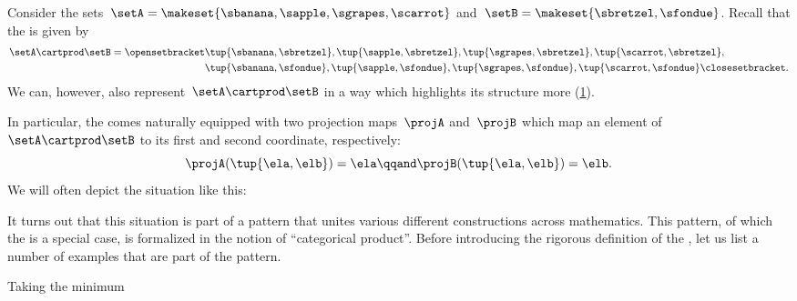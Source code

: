 \begin{example}
    Consider the sets~$\setA = \makeset{\sbanana, \sapple, \sgrapes, \scarrot}$ and~$\setB = \makeset{ \sbretzel, \sfondue }$.
    Recall that the  is given by
    \begin{equation}
        \label{eq:cart-prod-example}
        \begin{aligned}
            \setA \cartprod \setB = \opensetbracket & \tup{\sbanana, \sbretzel}, \tup{\sapple, \sbretzel}, \tup{\sgrapes, \sbretzel}, \tup{\scarrot, \sbretzel}, \\
                                                    & \tup{\sbanana,\sfondue}, \tup{\sapple, \sfondue}, \tup{\sgrapes, \sfondue}, \tup{\scarrot, \sfondue} \closesetbracket.
        \end{aligned}
    \end{equation}
    We can, however, also represent~$\setA \cartprod \setB$ in a way which highlights its structure more (\cref{fig:example_cartesian}).
    \begin{figure}[h!]
        \centering
        \caption{}
        \label{fig:example_cartesian}
    \end{figure}

    In particular, the  comes naturally equipped with two projection maps~$\projA$ and~$\projB$ which map an element of~$\setA \cartprod \setB$ to its first and second coordinate, respectively:
    \begin{equation}
        \projA(\tup{\ela,\elb}) =  \ela  \qqand \projB(\tup{\ela,\elb}) = \elb.
    \end{equation}
    We will often depict the situation like this:
\end{example}

It turns out that this situation is part of a pattern that unites various different constructions across mathematics.
This pattern, of which the  is a special case, is formalized in the notion of ``categorical product''.
Before introducing the rigorous definition of the , let us list a number of examples that are part of the pattern.

\begin{marginfigure}
    \centering
    \caption{Taking the minimum}
    \label{fig:exa_prod_min}
\end{marginfigure}

